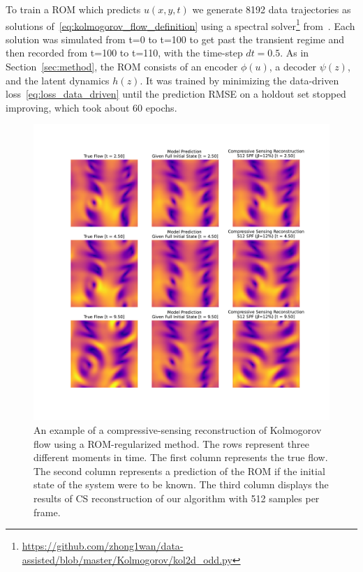 To train a ROM which predicts $u(x, y, t)$ we generate 8192 data trajectories as solutions of~\eqref{eq:kolmogorov_flow_definition} using a spectral solver\footnote{\href{https://github.com/zhong1wan/data-assisted/blob/master/Kolmogorov/kol2d_odd.py}{https://github.com/zhong1wan/data-assisted/blob/master/Kolmogorov/kol2d\_odd.py}} from~\cite{wan2018data}. Each solution was simulated from t=0 to t=100 to get past the transient regime and then recorded from t=100 to t=110, with the time-step $dt=0.5$. As in Section~\ref{sec:method}, the ROM consists of an encoder $\phi(u)$, a decoder $\psi(z)$, and the latent dynamics $h(z)$. It was trained by minimizing the data-driven loss~\eqref{eq:loss_data_driven} until the prediction RMSE on a holdout set stopped improving, which took about 60 epochs. 

\begin{figure}
	\centering
	\includegraphics[width=\textwidth]{figures/kolmogorov_example.pdf}
	\caption{\label{fig:kolmogorov_example} An example of a compressive-sensing reconstruction of Kolmogorov flow using a ROM-regularized method. The rows represent three different moments in time. The first column represents the true flow. The second column represents a prediction of the ROM if the initial state of the system were to be known. The third column displays the results of CS reconstruction of our algorithm with 512 samples per frame.}
\end{figure}


